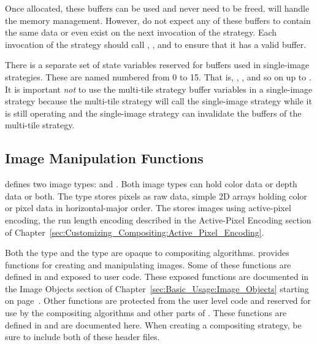 Once allocated, these buffers can be used and never need to be freed.
\IceT will handle the memory management.  However, do not expect any of
these buffers to contain the same data or even exist on the next invocation
of the strategy.  Each invocation of the strategy should call
, , and
 to ensure that it has a valid buffer.

There is a separate set of state variables reserved for buffers used in
single-image strategies.  These are named
 numbered from 0 to 15.
That is, ,
, and so on up to
.  It is important \emph{not} to use
the multi-tile strategy buffer variables in a single-image strategy because
the multi-tile strategy will call the single-image strategy while it is
still operating and the single-image strategy can invalidate the buffers of
the multi-tile strategy.

\subsection{Image Manipulation Functions}

\IceT defines two image types:  and
.  Both image types can hold color data or depth
data or both.  The  type stores pixels as raw data, simple
2D arrays holding color or pixel data in horizontal-major order.  The
 stores images using
active-pixel encoding, the run length encoding
described in the Active-Pixel Encoding section of
Chapter~\ref{sec:Customizing_Compositing:Active_Pixel_Encoding}.

Both the  type and the  type are
opaque to compositing algorithms.  \IceT provides functions for creating
and manipulating images.  Some of these functions are defined in
 and exposed to user code.  These exposed
functions are documented in the Image Objects section of
Chapter~\ref{sec:Basic_Usage:Image_Objects} starting on
page~\pageref{sec:Basic_Usage:Image_Objects}.  Other functions are
protected from the user level code and reserved for use by the compositing
algorithms and other parts of \IceT.  These functions are defined in
 and are documented here.  When
creating a compositing strategy, be sure to include both of these header
files.


